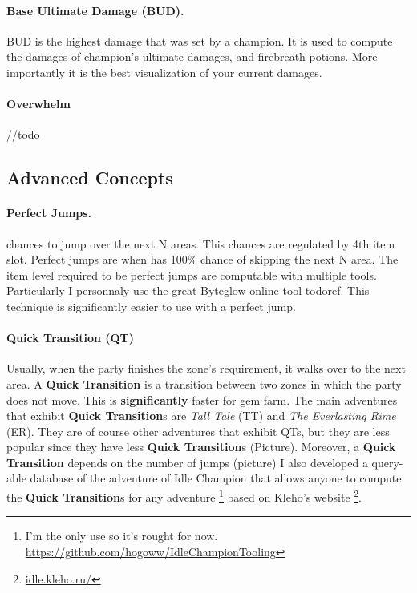 \documentclass{article}
\begin{document}
\paragraph{Base Ultimate Damage (BUD).}

BUD is the highest damage that was set by a champion.
It is used to compute the damages of champion's ultimate damages, and firebreath potions.
More importantly it is the best visualization of your current damages.


\paragraph{Overwhelm}

//todo

\subsection{Advanced Concepts}

\paragraph{Perfect Jumps.}

\briv chances to jump over the next N areas.
This chances are regulated by \briv 4th item slot.
Perfect jumps are when \briv has 100\% chance of skipping the next N area.
The item level required to be perfect jumps are computable with multiple tools.
Particularly I personnaly use the great Byteglow online tool todoref.
This technique is significantly easier to use with a perfect jump. 

\paragraph{Quick Transition (QT)}

Usually, when the party finishes the zone's requirement, it walks over to the next area.
A \textbf{Quick Transition} is a transition between two zones in which the party does not move.
This is \textbf{significantly} faster for gem farm.
The main adventures that exhibit  \textbf{Quick Transition}s are \textit{Tall Tale} (TT) and \textit{The Everlasting Rime} (ER).
They are of course other adventures that exhibit QTs, but they are less popular since they have less \textbf{Quick Transition}s (Picture).
Moreover, a \textbf{Quick Transition} depends on the number of jumps (picture)
I also developed a query-able database of the adventure of Idle Champion that allows anyone to compute the \textbf{Quick Transition}s for any adventure \footnote{I'm the only use so it's rought for now. \url{https://github.com/hogoww/IdleChampionTooling}} based on Kleho's website \footnote{\url{idle.kleho.ru/}}.
\end{document}
